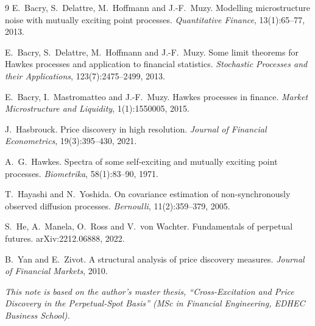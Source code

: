 \documentclass[a4paper,11pt]{article}
\begin{document}
\begin{thebibliography}{9}
\small
{}
E.~Bacry, S.~Delattre, M.~Hoffmann and J.-F.~Muzy.
\newblock Modelling microstructure noise with mutually exciting point processes.
\newblock \emph{Quantitative Finance}, 13(1):65--77, 2013.

E.~Bacry, S.~Delattre, M.~Hoffmann and J.-F.~Muzy.
\newblock Some limit theorems for Hawkes processes and application to financial statistics.
\newblock \emph{Stochastic Processes and their Applications}, 123(7):2475--2499, 2013.

E.~Bacry, I.~Mastromatteo and J.-F.~Muzy.
\newblock Hawkes processes in finance.
\newblock \emph{Market Microstructure and Liquidity}, 1(1):1550005, 2015.

J.~Hasbrouck.
\newblock Price discovery in high resolution.
\newblock \emph{Journal of Financial Econometrics}, 19(3):395--430, 2021.

A.~G.~Hawkes.
\newblock Spectra of some self-exciting and mutually exciting point processes.
\newblock \emph{Biometrika}, 58(1):83--90, 1971.

T.~Hayashi and N.~Yoshida.
\newblock On covariance estimation of non-synchronously observed diffusion processes.
\newblock \emph{Bernoulli}, 11(2):359--379, 2005.

S.~He, A.~Manela, O.~Ross and V.~von Wachter.
\newblock Fundamentals of perpetual futures.
\newblock arXiv:2212.06888, 2022.

B.~Yan and E.~Zivot.
\newblock A structural analysis of price discovery measures.
\newblock \emph{Journal of Financial Markets}, 2010.
\end{thebibliography}

\bigskip
\noindent\textit{This note is based on the author's master thesis, \enquote{Cross-Excitation and Price Discovery in the Perpetual-Spot Basis} (MSc in Financial Engineering, EDHEC Business School).}
\end{document}
